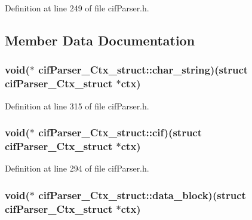 Definition at line 249 of file cif\-Parser.\-h.



\subsection{Member Data Documentation}
\hypertarget{structcif_parser___ctx__struct_a2aedf389a1f5aa4c2800cf6e45303aab}{
\subsubsection[{char\-\_\-string}]{\setlength{\rightskip}{0pt plus 5cm}void($\ast$ cif\-Parser\-\_\-\-Ctx\-\_\-struct\-::char\-\_\-string)(struct {\bf cif\-Parser\-\_\-\-Ctx\-\_\-struct} $\ast$ctx)}}\label{structcif_parser___ctx__struct_a2aedf389a1f5aa4c2800cf6e45303aab}


Definition at line 315 of file cif\-Parser.\-h.

\hypertarget{structcif_parser___ctx__struct_a63de38cc5898cccdcf530726fb1afff4}{
\subsubsection[{cif}]{\setlength{\rightskip}{0pt plus 5cm}void($\ast$ cif\-Parser\-\_\-\-Ctx\-\_\-struct\-::cif)(struct {\bf cif\-Parser\-\_\-\-Ctx\-\_\-struct} $\ast$ctx)}}\label{structcif_parser___ctx__struct_a63de38cc5898cccdcf530726fb1afff4}


Definition at line 294 of file cif\-Parser.\-h.

\hypertarget{structcif_parser___ctx__struct_a2bf6a8d971f11d6b7bbcfc89c473bac4}{
\subsubsection[{data\-\_\-block}]{\setlength{\rightskip}{0pt plus 5cm}void($\ast$ cif\-Parser\-\_\-\-Ctx\-\_\-struct\-::data\-\_\-block)(struct {\bf cif\-Parser\-\_\-\-Ctx\-\_\-struct} $\ast$ctx)}}\label{structcif_parser___ctx__struct_a2bf6a8d971f11d6b7bbcfc89c473bac4}


